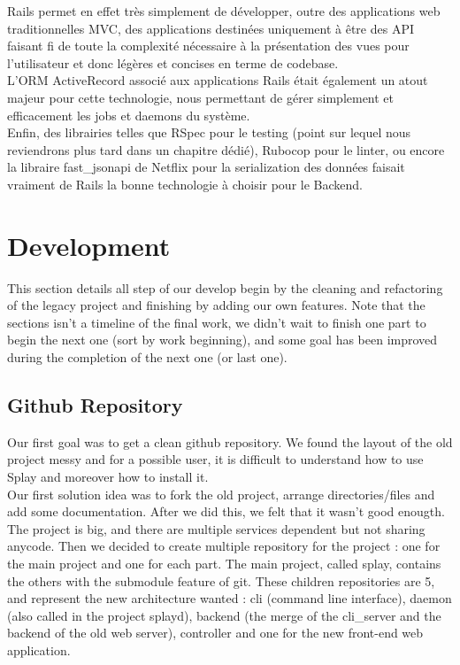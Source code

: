 \documentclass{eplmastersthesis}
\begin{document}
        Rails permet en effet très simplement de développer, outre des
        applications web traditionnelles MVC, des applications destinées uniquement
        à être des API faisant fi de toute la complexité nécessaire à la
        présentation des vues pour l'utilisateur et donc légères et concises
        en terme de codebase.\\
        L'ORM ActiveRecord associé aux applications Rails était également un
        atout majeur pour cette technologie, nous permettant de gérer
        simplement et efficacement les jobs et daemons du système.\\
        Enfin, des librairies telles que RSpec pour le testing (point sur
        lequel nous reviendrons plus tard dans un chapitre dédié), Rubocop pour
        le linter, ou encore la libraire fast\_jsonapi de Netflix pour la
        serialization des données faisait vraiment de Rails la bonne technologie
        à choisir pour le Backend.

    \section{Development}

      This section details all step of our develop begin by the cleaning and refactoring of the
      legacy project and finishing by adding our own features. Note that the sections isn't a timeline
      of the final work, we didn't wait to finish one part to begin the next one (sort by work beginning),
      and some goal has been improved during the completion of the next one (or last one).

      \subsection{Github Repository}

        Our first goal was to get a clean github repository. We found the layout of the old project messy
        and for a possible user, it is difficult to understand how to use Splay and moreover how to install it. \\

        Our first solution idea was to fork the old project, arrange directories/files and add
        some documentation. After we did this, we felt that it wasn't good enougth. The project is big,
        and there are multiple services dependent but not sharing anycode. Then we decided to create multiple
        repository for the project : one for the main project and one for each part. The main project,
        called splay, contains the others with the submodule \cite{GitSubmodules} feature of git.
        These children repositories are 5, and represent the new architecture wanted :
        cli (command line interface), daemon (also called in the project splayd), backend
        (the merge of the cli\_server and the backend of the old web server), controller
        and one for the new front-end web application. \\
\end{document}
